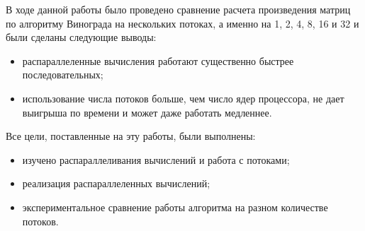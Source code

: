 \Conclusion

В ходе данной работы было проведено сравнение расчета произведения матриц по алгоритму Винограда на нескольких потоках, а именно на 1, 2, 4, 8, 16 и 32 и были сделаны следующие выводы:

\begin{itemize}
    \item распараллеленные вычисления работают существенно быстрее последовательных;
    \item использование числа потоков больше, чем число ядер процессора, не дает выигрыша по времени и может даже работать медленнее.
\end{itemize}

Все цели, поставленные на эту работы, были выполнены:

\begin{itemize}
    \item изучено распараллеливания вычислений и работа с потоками;
    \item реализация распараллеленных вычислений;
    \item экспериментальное сравнение работы алгоритма на разном количестве потоков.
\end{itemize}

